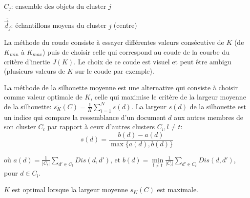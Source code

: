 $C_j$: ensemble des objets du cluster $j$

$\overline{\vec{d}_j}$: échantillons moyens du cluster $j$ (centre)

La méthode du coude consiste à essayer différentes valeurs consécutive de $K$ (de $K_{min}$ à $K_{max}$) puis de choisir celle qui correspond au coude de la courbe du critère d'inertie $J(K)$. Le choix de ce coude est visuel et peut être ambigu (plusieurs valeurs de $K$ sur le coude par exemple). 

La méthode de la silhouette moyenne \citep{rousseeuw1987silhouetteclusternumber} est une alternative qui consiste à choisir comme valeur optimale de $K$, celle qui maximise le critère de la largeur moyenne de la silhouette: $\overline{s_K}(C) = \frac{1}{K}\sum\limits_{i=1}^N s(d)$. La largeur $s(d)$ de la silhouette est un indice qui compare la ressemblance d'un document $d$ aux autres membres de son cluster $C_t$ par rapport à ceux d'autres clusters $C_l, l \neq t$:
\[s(d) = \frac{b(d) - a(d)}{\max\lbrace a(d),b(d)\rbrace}\]

où $a(d) = \frac{1}{\vert C_t \vert} \sum\limits_{d' \in C_t} Dis(d, d')$, et $b(d) = \min\limits_{l \neq t} \frac{1}{\vert C_l \vert} \sum\limits_{d' \in C_t} Dis(d, d')$, pour $d \in C_l$.

$K$ est optimal lorsque la largeur moyenne $\overline{s_K}(C)$ est maximale. %




